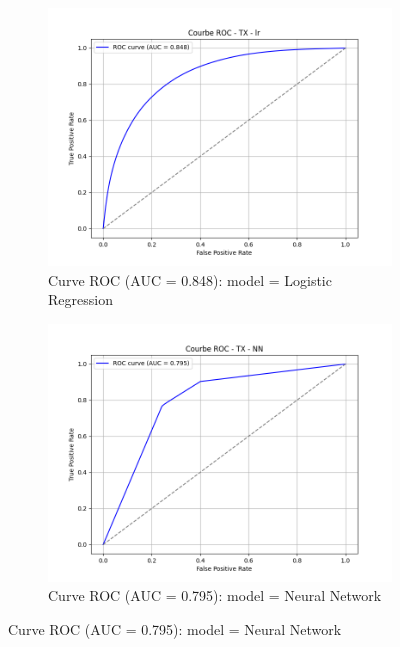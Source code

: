 \begin{figure}[h]
    \centering
    \begin{subfigure}[b]{0.48\textwidth}
        \includegraphics[width=\textwidth]{Images/curve_roc_folktables/roc_curve_TX_lr.png}
        \caption{Curve ROC (AUC = 0.848): model = Logistic Regression}
        \label{fig:TX_lr}
    \end{subfigure}
    \hfill
    \begin{subfigure}[b]{0.48\textwidth}
        \includegraphics[width=\textwidth]{Images/curve_roc_folktables/roc_curve_TX_NN.png}
        \caption{Curve ROC (AUC = 0.795): model = Neural Network}
        \label{fig:TX_nn}
    \end{subfigure}


\end{figure}
